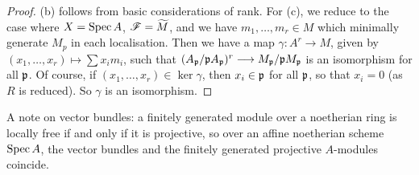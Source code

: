 \documentclass[11pt]{article}
\begin{document}
\begin{II.5 Sheaves of Modules}
\begin{itemise}
\begin{proof}
(b) follows from basic considerations of rank. For (c), we reduce to the case
where $X=\operatorname{Spec} A$, $\mathscr{F}=\widetilde M$, and we have $m_1,\ldots,m_r\in M$ which
minimally generate $M_p$ in each localisation. Then we have a map $\gamma:A^r\to
M$, given by $(x_1,\ldots,x_r)\mapsto \sum x_im_i$, such that $(A_{\mathfrak{p}}/\mathfrak{p}
A_{\mathfrak{p}})^r\longrightarrow M_{\mathfrak{p}}/\mathfrak{p} M_{\mathfrak{p}}$ is an isomorphism for all $\mathfrak{p}$. Of
course, if $(x_1,\ldots,x_r)\in\ker\gamma$, then $x_i\in\mathfrak{p}$ for all
$\mathfrak{p}$, so that $x_i=0$ (as $R$ is reduced). So $\gamma$ is an isomorphism.
\end{proof}
\item A note on vector bundles: a finitely generated module over a noetherian
ring is locally free if and only if it is projective, so over an affine
noetherian scheme $\operatorname{Spec} A$, the vector bundles and the finitely generated
projective $A$-modules coincide.
\end{itemise}
\end{II.5 Sheaves of Modules}
\end{document}
